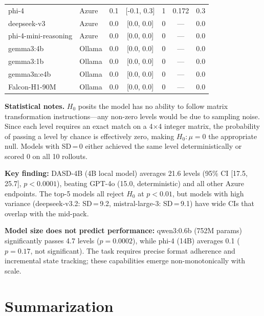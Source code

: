 \documentclass[11pt,a4paper]{article}
\begin{document}
\begin{table}[h]
\begin{tabular}{@{}llrcrcc@{}}
phi-4                & Azure  & 0.1           & [-0.1, \phantom{0}0.3] & 1  & 0.172 & 0.3 \\
deepseek-v3          & Azure  & 0.0           & [\phantom{0}0.0, \phantom{0}0.0] & 0  & --- & 0.0 \\
phi-4-mini-reasoning & Azure  & 0.0           & [\phantom{0}0.0, \phantom{0}0.0] & 0  & --- & 0.0 \\
gemma3:4b            & Ollama & 0.0           & [\phantom{0}0.0, \phantom{0}0.0] & 0  & --- & 0.0 \\
gemma3:1b            & Ollama & 0.0           & [\phantom{0}0.0, \phantom{0}0.0] & 0  & --- & 0.0 \\
gemma3n:e4b          & Ollama & 0.0           & [\phantom{0}0.0, \phantom{0}0.0] & 0  & --- & 0.0 \\
Falcon-H1-90M        & Ollama & 0.0           & [\phantom{0}0.0, \phantom{0}0.0] & 0  & --- & 0.0 \\
\bottomrule
\end{tabular}
\label{tab:instruction}
\end{table}

\textbf{Statistical notes.} $H_0$ posits the model has no ability to follow matrix transformation instructions---any non-zero levels would be due to sampling noise. Since each level requires an exact match on a 4$\times$4 integer matrix, the probability of passing a level by chance is effectively zero, making $H_0\!: \mu = 0$ the appropriate null. Models with SD\,=\,0 either achieved the same level deterministically or scored 0 on all 10 rollouts.

\textbf{Key finding:} DASD-4B (4B local model) averages 21.6 levels (95\% CI [17.5, 25.7], $p < 0.0001$), beating GPT-4o (15.0, deterministic) and all other Azure endpoints. The top-5 models all reject $H_0$ at $p < 0.01$, but models with high variance (deepseek-v3.2: SD\,=\,9.2, mistral-large-3: SD\,=\,9.1) have wide CIs that overlap with the mid-pack.

\textbf{Model size does not predict performance:} qwen3:0.6b (752M params) significantly passes 4.7 levels ($p = 0.0002$), while phi-4 (14B) averages 0.1 ($p = 0.17$, not significant). The task requires precise format adherence and incremental state tracking; these capabilities emerge non-monotonically with scale.

\section{Summarization}
\end{document}

